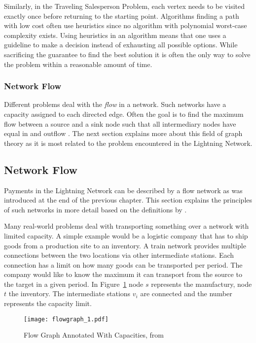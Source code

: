\documentclass[final]{fhnwreport}       %
\begin{document}
Similarly, in the Traveling Salesperson Problem, each vertex needs to be visited exactly once before returning to the starting point. Algorithms finding a path with low cost often use heuristics since no algorithm with polynomial worst-case complexity exists. Using heuristics in an algorithm means that one uses a guideline to make a decision instead of exhausting all possible options. While sacrificing the guarantee to find the best solution it is often the only way to solve the problem within a reasonable amount of time.

\subsubsection{Network Flow}
Different problems deal with the \emph{flow} in a network. Such networks have a capacity assigned to each directed edge. Often the goal is to find the maximum flow between a source and a sink node such that all intermediary nodes have equal in and outflow \citep{even_network_1975}. The next section explains more about this field of graph theory as it is most related to the problem encountered in the Lightning Network.

\subsection{Network Flow}\label{subsec:flow}
Payments in the Lightning Network can be described by a flow network as was introduced at the end of the previous chapter. This section explains the principles of such networks in more detail based on the definitions by \cite{wilson_introduction_2010}.

Many real-world problems deal with transporting something over a network with limited capacity. A simple example would be a logistic company that has to ship goods from a production site to an inventory. A train network provides multiple connections between the two locations via other intermediate stations. Each connection has a limit on how many goods can be transported per period. The company would like to know the maximum it can transport from the source to the target in a given period. In Figure~\ref{fig:flow_graph} node $s$ represents the manufactury, node $t$ the inventory. The intermediate stations $v_i$ are connected and the number represents the capacity limit.

\begin{figure}[H]
\centering
\texttt{[image: flowgraph\_1.pdf]}
\caption{Flow Graph Annotated With Capacities, from \cite{brossard_graph_2010}}
\label{fig:flow_graph}
\end{figure}
\end{document}
